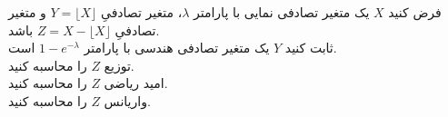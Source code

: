 \problem{}
فرض کنید \( X \) یک متغیر تصادفی نمایی با پارامتر \( \lambda \)،
متغیر تصادفیِ 
\( Y = \lfloor X \rfloor \) 
و متغیر تصادفیِ
\( Z =  X - \lfloor X \rfloor \) 
باشد.\\
[5pt]
\subproblem{}
 ثابت کنید \( Y \) یک متغیر تصادفی هندسی با پارامتر 
\( 1 - e^{-\lambda} \)
است.
\\
\subproblem{}
توزیع \( Z \) را محاسبه کنید.
\\
\subproblem{}
امید ریاضی \( Z \) را محاسبه کنید.
\\
\subproblem{}
واریانس \( Z \) را محاسبه کنید.